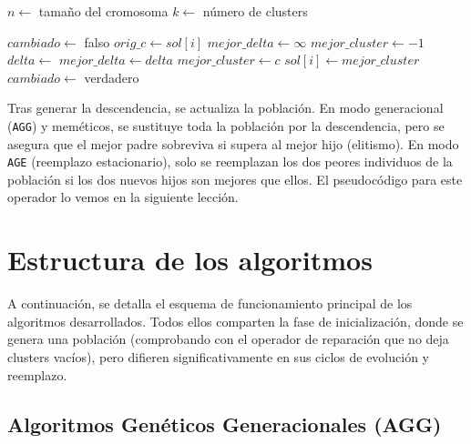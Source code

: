 \documentclass[a4paper,12pt]{article}%
\begin{document}
\begin{algorithm}
	\begin{algorithmic}
		\State $n \leftarrow$ tamaño del cromosoma
		\State $k \leftarrow$ número de clusters
		
		\State $cambiado \leftarrow$ falso
		\State $orig\_c \leftarrow sol[i]$
		\State $mejor\_delta \leftarrow \infty$
		\State $mejor\_cluster \leftarrow -1$
		\State $delta \leftarrow$ 
		\State $mejor\_delta \leftarrow delta$
		\State $mejor\_cluster \leftarrow c$
		\EndIf
		\EndIf
		\EndFor
		\State $sol[i] \leftarrow mejor\_cluster$
		\State $cambiado \leftarrow$ verdadero
		\EndIf
		\EndIf
		\EndFor
		\State {}
		\EndIf
		\EndFor
		\EndFunction
	\end{algorithmic}
\end{algorithm}


Tras generar la descendencia, se actualiza la población. En modo generacional (\texttt{AGG}) y meméticos, se sustituye toda la población por la descendencia, pero se asegura que el mejor padre sobreviva si supera al mejor hijo (elitismo). En modo \texttt{AGE} (reemplazo estacionario), solo se reemplazan los dos peores individuos de la población si los dos nuevos hijos son mejores que ellos. El pseudocódigo para este operador lo vemos en la siguiente lección.


\newpage
\section{Estructura de los algoritmos}

\noindent A continuación, se detalla el esquema de funcionamiento principal de los algoritmos desarrollados. Todos ellos comparten la fase de inicialización, donde se genera una población (comprobando con el operador de reparación que no deja clusters vacíos), pero difieren significativamente en sus ciclos de evolución y reemplazo.

\subsection{Algoritmos Genéticos Generacionales (AGG)}
\end{document}
